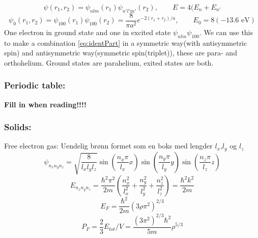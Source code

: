 \documentclass[a4paper,norsk, 10pt]{article}
\begin{document}
\begin{equation}
\psi(r_1,r_2) = \psi_{nlm}(r_1)\psi_{n'l'm'}(r_2), \qquad E = 4(E_n + E_{n'}
\end{equation}
\begin{equation}
\psi_0(r_1,r_2) = \psi_{100}(r_1)\psi_{100}(r_2) = \frac{8}{\pi a^2}e^{-2(r_1 + r_2)/a}, \qquad E_0 = 8(-13.6 \text{ eV})
\end{equation}
One electron in ground state and one in excited state $\psi_{nlm}\psi_{100}$. We can use this to make a combination \eqref{eq:identPart} in a symmetric way(with antisymmetric spin) and antisymmetric way(symmetric spin(triplet)), these are para- and orthohelium. Ground states are parahelium, exited states are both.

\subsubsection{Periodic table:}
\textbf{Fill in when reading!!!!}

\subsubsection{Solids:}
Free electron gas:
Uendelig brønn formet som en boks med lengder $l_x$,$l_y$ og $l_z$
\begin{equation}
\psi_{n_xn_yn_z} = \sqrt{\frac{8}{l_xl_yl_z}}\sin(\frac{n_x\pi}{l_x}x)\sin(\frac{n_y\pi}{l_y}y)\sin(\frac{n_z\pi}{l_z}z)
\end{equation}
\begin{equation}
E_{n_xn_yn_z} = \frac{\hbar^2\pi^2}{2m}\left(\frac{n_x^2}{l_x^2}+\frac{n_y^2}{l_y^2}+\frac{n_z^2}{l_z^2}\right) = \frac{\hbar^2k^2}{2m}
\end{equation}
\begin{equation}
E_F = \frac{\hbar^2}{2m}(3\rho\pi^2)^{2/3}
\end{equation}
\begin{equation}
P_F = \frac{2}{3}E_{tot}/V = \frac{(3\pi^2)^{2/3}\hbar^2}{5m}\rho^{5/3}
\end{equation}
\end{document}

